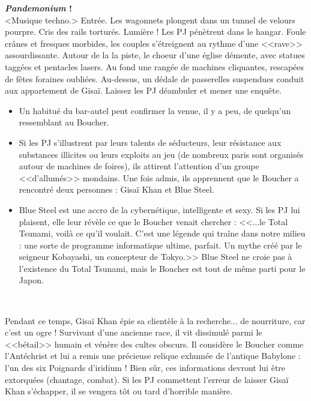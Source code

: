 \documentclass[11pt,twoside,a4paper]{book}
\begin{document}
\textbf{\large \textit{Pandemonium} !}~\\

<Musique techno.> Entr{\'e}e. Les wagonnets plongent dans un tunnel de velours pourpre. Cris des rails tortur{\'e}s. Lumi{\`e}re ! Les PJ p{\'e}n{\`e}trent dans le hangar. Foule cr{\^a}nes et fresques morbides, les couples s'{\'e}treignent au rythme d'une <<rave>> assourdissante. Autour de la la piste, le choeur d'une {\'e}glise d{\'e}mente, avec statues tagg{\'e}es et pentacles lasers. Au fond une rang{\'e}e de machines cliquantes, rescap{\'e}es de f{\^e}tes foraines oubli{\'e}es. Au-dessus, un d{\'e}dale de passerelles suspendues conduit aux appartement de Gisa{\"i}. Laissez les PJ d{\'e}ambuler et mener une enqu{\^e}te.~\\

\setlength\parindent{20pt}
\begin{itemize}
	\item Un habitu{\'e} du bar-autel peut confirmer la venue, il y a peu, de quelqu'un ressemblant au Boucher.
	\item Si les PJ s'illustrent par leurs talents de s{\'e}ducteurs, leur r{\'e}sistance aux substances illicites ou leurs exploits au jeu (de nombreux paris sont organis{\'e}s autour de machines de foires), ils attirent l'attention d'un groupe <<d'allum{\'e}s>> mondains. Une fois admis, ils apprennent que le Boucher a rencontr{\'e} deux personnes : Gisa{\"i} Khan et Blue Steel.
	\item Blue Steel est une accro de la cybern{\'e}tique, intelligente et sexy. Si les PJ lui plaisent, elle leur r{\'e}v{\`e}le ce que le Boucher venait chercher : <<...le Total Tsunami, voil{\`a} ce qu'il voulait. C'est une l{\'e}gende qui tra{\^i}ne dans notre milieu : une sorte de programme informatique ultime, parfait. Un mythe cr{\'e}{\'e} par le seigneur Kobayashi, un concepteur de Tokyo.>> Blue Steel ne croie pas {\`a} l'existence du Total Tsunami, mais le Boucher est tout de m{\^e}me parti pour le Japon.
\end{itemize}~\\
\setlength\parindent{0pt}

Pendant ce temps, Gisa{\"i} Khan {\'e}pie sa client{\`e}le {\`a} la recherche... de nourriture, car c'est un ogre ! Survivant d'une ancienne race, il vit dissimul{\'e} parmi le <<b{\'e}tail>> humain et v{\'e}n{\`e}re des cultes obscurs. Il consid{\`e}re le Boucher comme l'Ant{\'e}christ et lui a remis une pr{\'e}cieuse relique exhum{\'e}e de l'antique Babylone : l'un des six Poignards d'iridium ! Bien s{\^u}r, ces informations devront lui {\^e}tre extorqu{\'e}es (chantage, combat). Si les PJ commettent l'erreur de laisser Gisa{\"i} Khan s'{\'e}chapper, il se vengera t{\^o}t ou tard d'horrible mani{\`e}re.~\\
\end{document}
